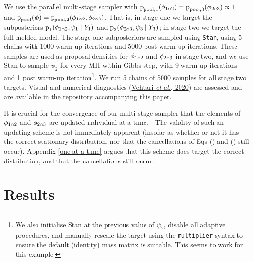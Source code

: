 \documentclass[
  10pt,
  a4paper,
]{article}
\let\Oldcap\cap
\renewcommand{\cap}{\mathrel{\mathsmaller{\Oldcap}}}
\newcommand{\pd}{\text{p}}
\begin{document}
We use the parallel multi-stage sampler with
\(\pd_{\text{pool}, 1}(\phi_{1 \cap 2}) = \pd_{\text{pool}, 3}(\phi_{2 \cap 3}) \propto 1\)
and
\(\pd_{\text{pool}}(\boldsymbol{\phi}) = \pd_{\text{pool}, 2}(\phi_{1 \cap 2}, \phi_{2 \cap 3})\).
That is, in stage one we target the subposteriors
\(\pd_{1}(\phi_{1 \cap 2}, \psi_{1} \mid Y_{1})\) and
\(\pd_{3}(\phi_{2 \cap 3}, \psi_{3} \mid Y_{3})\); in stage two we
target the full melded model. The stage one subposteriors are sampled
using \texttt{Stan}, using 5 chains with 1000 warm-up iterations and
5000 post warm-up iterations. These samples are used as proposal
densities for \(\phi_{1 \cap 2}\) and \(\phi_{2 \cap 3}\) in stage two,
and we use Stan to sample \(\psi_{2}\) for every MH-within-Gibbs step,
with 9 warm-up iterations and 1 post warm-up iteration\footnote{We also
  initialise Stan at the previous value of \(\psi_{2}\), disable all
  adaptive procedures, and manually rescale the target using the
  \texttt{multiplier} syntax to ensure the default (identity) mass
  matrix is suitable. This seems to work for this example.}. We run 5
chains of 5000 samples for all stage two targets. Visual and numerical
diagnostics
(\protect\hyperlink{ref-vehtari_rank-normalization_2020}{Vehtari
\emph{et al.}, 2020}) are assessed and are available in the repository
accompanying this paper.

It is crucial for the convergence of our multi-stage sampler that the
elements of \(\phi_{1 \cap 2}\) and \(\phi_{2 \cap 3}\) are updated
individual-at-a-time. - The validity of such an updating scheme is not
immediately apparent (insofar as whether or not it has the correct
stationary distribution, nor that the cancellations of Eqs () and ()
still occur). Appendix \ref{one-at-a-time} argues that this scheme does
target the correct distribution, and that the cancellations still occur.

\hypertarget{results}{%
\section{Results}\label{results}}
\end{document}
